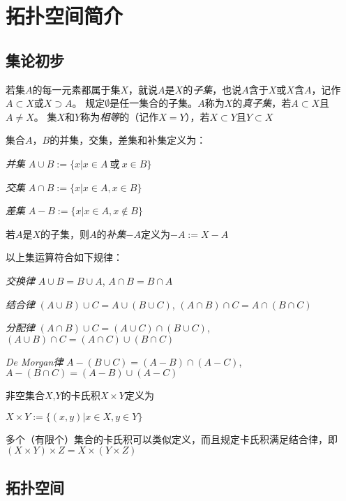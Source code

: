 \chapter{拓扑空间简介}
\section{集论初步}

\begin{definition}
若集$A$的每一元素都属于集$X$，就说$A$是$X$的\emph{子集}，也说$A$含于$X$或$X$含$A$，记作$A \subset X$或$X \supset A$。
规定$\emptyset$是任一集合的子集。$A$称为$X$的\emph{真子集}，若$A \subset X$且$A \neq X$。
集$X$和$Y$称为\emph{相等}的（记作$X = Y$），若$X \subset Y$且$Y \subset X$
\end{definition}

\begin{definition}
集合$A$，$B$的并集，交集，差集和补集定义为：

\emph{并集} $A \cup B := \{x | x \in A ~ \text{或} ~ x \in B\}$

\emph{交集} $A \cap B := \{x | x \in A, x \in B\}$

\emph{差集} $A - B := \{x | x \in A, x \notin B\}$

若$A$是$X$的子集，则$A$的\emph{补集}$-A$定义为$-A := X - A$

\end{definition}

\begin{theorem}
以上集运算符合如下规律：

\emph{交换律} $A \cup B = B \cup A$, $A \cap B = B \cap A$

\emph{结合律} $(A \cup B) \cup C = A \cup (B \cup C)$, $(A \cap B) \cap C = A \cap (B \cap C)$

\emph{分配律} $(A \cap B) \cup C = (A \cup C) \cap (B \cup C)$, $(A \cup B) \cap C = (A \cap C) \cup (B \cap C)$

\emph{De Morgan律} $A - (B \cup C) = (A - B) \cap (A - C)$, $A - (B \cap C) = (A - B) \cup (A - C)$

\end{theorem}

\begin{definition}
非空集合$X$,$Y$的卡氏积$X \times Y$定义为

$X \times Y := \{(x, y) | x \in X, y \in Y\}$
\end{definition}
多个（有限个）集合的卡氏积可以类似定义，而且规定卡氏积满足结合律，即$(X \times Y) \times Z = X \times (Y \times Z)$

\section{拓扑空间}